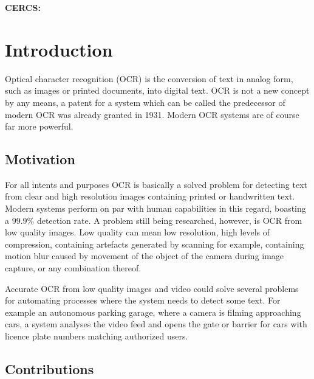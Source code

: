 \documentclass[12pt]{article}
\newcommand{\TODO}{\todo[inline]}
\begin{document}
\vspace*{1ex}

\noindent\textbf{CERCS:}\\


\vspace*{1ex}

\newpage

\tableofcontents

\newpage
{}%


\newpage
\section{Introduction}

Optical character recognition (OCR) is the conversion of text in analog form, such as images or printed documents, into digital text. OCR is not a new concept by any means, a patent for a system which can be called the predecessor of modern OCR was already granted in 1931. Modern OCR systems are of course far more powerful.

\subsection{Motivation}

For all intents and purposes OCR is basically a solved problem for detecting text from clear and high resolution images containing printed or handwritten text. Modern systems perform on par with human capabilities in this regard, boasting a 99.9\% detection rate. A problem still being researched, however, is OCR from low quality images. Low quality can mean low resolution, high levels of compression, containing artefacts generated by scanning for example, containing motion blur caused by movement of the object of the camera during image capture, or any combination thereof.

Accurate OCR from low quality images and video could solve several problems for automating processes where the system needs to detect some text. For example an autonomous parking garage, where a camera is filming approaching cars, a system analyses the video feed and opens the gate or barrier for cars with licence plate numbers matching authorized users.

\subsection{Contributions}
\end{document}
